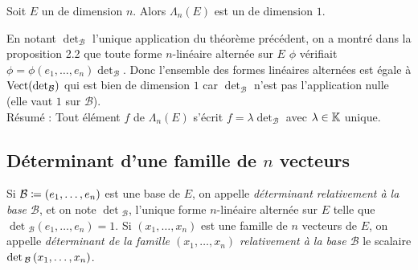 \documentclass{magnolia}
\begin{document}
\begin{proposition}
Soit $E$ un \Kev de dimension $n$. Alors $\Lambda_n(E)$ est un \Kev de
dimension $1$.
\end{proposition}

\begin{preuve}
En notant $\det_{\mathcal{B}}$ l'unique application du théorème précédent, on a montré dans la proposition 2.2 que toute forme $n$-linéaire alternée sur $E$ $\phi$ vérifiait $\phi=\phi(e_1,\ldots,e_n)\det_\mathcal{B}$. Donc l'ensemble des formes linéaires alternées est égale à $\operatorname{Vect}(\mathop{\rm det}_{\mathcal{B}})$ qui est bien de dimension $1$ car $\det_{\mathcal{B}}$ n'est pas l'application nulle (elle vaut $1$ sur $\mathcal{B}$).\\

Résumé : Tout élément $f$ de $\Lambda_n(E)$ s'écrit $f=\lambda \det_{\mathcal{B}}$ avec $\lambda \in \mathbb{K}$ unique. 
\end{preuve}




\subsection{Déterminant d'une famille de $n$ vecteurs}

\begin{definition}
Si $\mathcal{B}\coloneqq\left(e_1,\ldots,e_n\right)$ est une base de $E$, on appelle \emph{déterminant relativement à la base
$\mathcal{B}$}, et on note $\det{}_{\mathcal{B}}$, l'unique forme $n$-linéaire alternée sur $E$ telle que
$\det{}_{\mathcal{B}}(e_1,\ldots,e_n)=1$. Si $(x_1,\ldots,x_n)$ est une famille de $n$ vecteurs de $E$, on appelle
\emph{déterminant de la famille $(x_1,\ldots,x_n)$ relativement à la base $\mathcal{B}$} le scalaire
$\mathop{\rm det}{}_{\mathcal{B}}\left(x_1,\ldots,x_n\right)$.
\end{definition}
\end{document}

